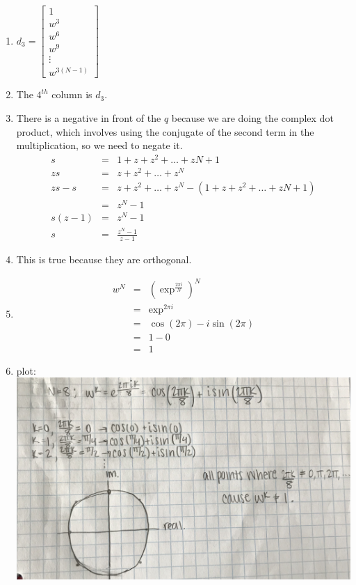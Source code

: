 \documentclass{article}
\begin{document}
\begin{enumerate}
\item $d_3 = 
\begin{bmatrix}
	1\\
	w^3\\
	w^6\\
	w^9\\
	\vdots\\
	w^{3(N-1)}
\end{bmatrix}
$

\item The $4^{th}$ column is $d_3$. 

\item There is a negative in front of the $q$ because we are doing the complex dot product, which involves using the conjugate of the second term in the multiplication, so we need to negate it. 
\begin{eqnarray*}
	s &=& 1 + z + z^2 + \dots + z{N+1}\\
	zs &=& z + z^2 + \dots + z^N\\
	zs - s &=& z + z^2 + \dots + z^N - (1 + z + z^2 + \dots + z{N+1})\\
	&=& z^N - 1\\
	s(z - 1) &=& z^N - 1\\
	s &=& \frac{z^N - 1}{z-1}
\end{eqnarray*}

\item This is true because they are orthogonal.

\item 
\begin{eqnarray*}
	w^N &=& \left(\exp^{\frac{2\pi i}{N}}\right)^N\\
	&=& \exp^{2 \pi i}\\
	&=& \cos{(2 \pi)} - i \sin{(2 \pi)}\\
	&=& 1 - 0\\
	&=& 1
\end{eqnarray*}

\item plot: \\
\includegraphics[scale=0.1]{exercise19} 


\end{enumerate}
\end{document}
